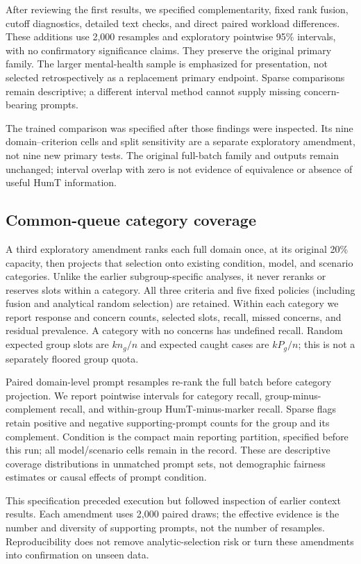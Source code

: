 \documentclass[manuscript,screen,review,anonymous]{acmart}
\begin{document}
After reviewing the first results, we specified complementarity, fixed rank fusion, cutoff diagnostics, detailed text checks, and direct paired workload differences. These additions use 2,000 resamples and exploratory pointwise 95\% intervals, with no confirmatory significance claims. They preserve the original primary family. The larger mental-health sample is emphasized for presentation, not selected retrospectively as a replacement primary endpoint. Sparse comparisons remain descriptive; a different interval method cannot supply missing concern-bearing prompts.

The trained comparison was specified after those findings were inspected. Its nine domain--criterion cells and split sensitivity are a separate exploratory amendment, not nine new primary tests. The original full-batch family and outputs remain unchanged; interval overlap with zero is not evidence of equivalence or absence of useful HumT information.

\subsection{Common-queue category coverage}
A third exploratory amendment ranks each full domain once, at its original 20\% capacity, then projects that selection onto existing condition, model, and scenario categories. Unlike the earlier subgroup-specific analyses, it never reranks or reserves slots within a category. All three criteria and five fixed policies (including fusion and analytical random selection) are retained. Within each category we report response and concern counts, selected slots, recall, missed concerns, and residual prevalence. A category with no concerns has undefined recall. Random expected group slots are $kn_g/n$ and expected caught cases are $kP_g/n$; this is not a separately floored group quota.

Paired domain-level prompt resamples re-rank the full batch before category projection. We report pointwise intervals for category recall, group-minus-complement recall, and within-group HumT-minus-marker recall. Sparse flags retain positive and negative supporting-prompt counts for the group and its complement. Condition is the compact main reporting partition, specified before this run; all model/scenario cells remain in the record. These are descriptive coverage distributions in unmatched prompt sets, not demographic fairness estimates or causal effects of prompt condition.

This specification preceded execution but followed inspection of earlier context results. Each amendment uses 2,000 paired draws; the effective evidence is the number and diversity of supporting prompts, not the number of resamples. Reproducibility does not remove analytic-selection risk or turn these amendments into confirmation on unseen data.
\end{document}
